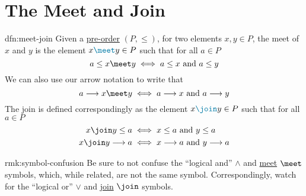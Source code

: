\section{The Meet and Join}\label{sec:meet-join}
\begin{dfn}{dfn:meet-join}
    Given a \hyperref[dfn:pre-order]{pre-order} \( (P, \leq) \), for two elements \( x, y \in P \), the \textcolor{dfn-color}{meet} of \( x \) and \( y \) is the element \( x \textcolor{dfn-color}{\meet} y \in P \) such that for all \( a \in P \)
    \[
        a \leq x \meet y \iff a \leq x \text{ and } a \leq y
    \]
    We can also use our arrow notation to write that
    \[
        a \longrightarrow x \meet y \iff a \longrightarrow x \text{ and } a \longrightarrow y
    \]
    The \textcolor{dfn-color}{join} is defined correspondingly as the element \( x \textcolor{dfn-color}{\join} y \in P \) such that for all \( a \in P \)
    \begin{align*}
        x \join y \leq a &\iff x \leq a \text{ and } y \leq a \\
        x \join y \longrightarrow a &\iff x \longrightarrow a \text{ and } y \longrightarrow a \\
    \end{align*}
\end{dfn}
\newpage
\begin{rmk}{rmk:symbol-confusion}
    Be sure to not confuse the ``logical and'' \( \land \) and \hyperref[dfn:meet-join]{meet} \( \meet \) symbols, which, while related, are not the same symbol.
    Correspondingly, watch for the ``logical or'' \( \lor \) and \hyperref[dfn:meet-join]{join} \( \join \) symbols.
\end{rmk}

